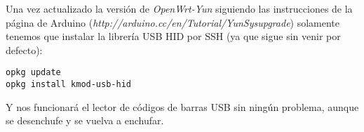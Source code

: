 Una vez actualizado la versión de \emph{OpenWrt-Yun} siguiendo las instrucciones de la página de Arduino (\emph{http://arduino.cc/en/Tutorial/YunSysupgrade}) solamente tenemos que instalar la librería USB HID por SSH (ya que sigue sin venir por defecto):

	\begin{lstlisting}
opkg update
opkg install kmod-usb-hid
	\end{lstlisting}

Y nos funcionará el lector de códigos de barras USB sin ningún problema, aunque se desenchufe y se vuelva a enchufar.